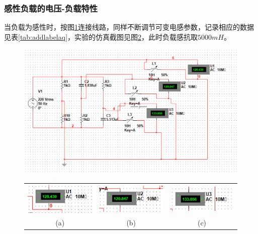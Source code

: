\documentclass[12pt]{article}%
\begin{document}
\subsubsection{感性负载的电压-负载特性}
当负载为感性时，按图\ref{fig:a12aq}连接线路，同样不断调节可变电感参数，记录相应的数据见表\ref{tab:addlabelaq}，实验的仿真截图见图\ref{fig:x11aq}，此时负载感抗取$5000mH$。
\begin{figure}[htbp]
\centering\includegraphics[width=\linewidth]{TIM20180601014335.png}
\caption{\heiti{}}\label{fig:a12aq}
\end{figure}
\begin{figure}[htbp]
\centering
\begin{tabular}{ccc}
\includegraphics[width=0.3\linewidth]{TIM20180607122358.png}&
\includegraphics[width=0.3\linewidth]{TIM20180607122421.png}&
\includegraphics[width=0.3\linewidth]{TIM20180607122638.png}\\
(a)&(b)&(c)\\
\end{tabular}
\caption{\heiti{}}\label{fig:x11aq}
\end{figure}
\end{document}
